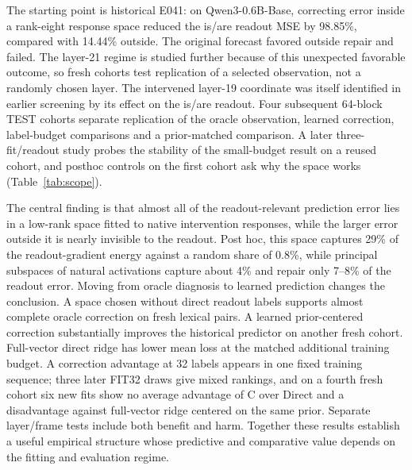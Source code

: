 \documentclass[11pt]{article}
\begin{document}
The starting point is historical E041: on Qwen3-0.6B-Base, correcting error inside a rank-eight response space reduced the is/are readout MSE by 98.85\%, compared with 14.44\% outside. The original forecast favored outside repair and failed. The layer-21 regime is studied further because of this unexpected favorable outcome, so fresh cohorts test replication of a selected observation, not a randomly chosen layer. The intervened layer-19 coordinate was itself identified in earlier screening by its effect on the is/are readout. Four subsequent 64-block TEST cohorts separate replication of the oracle observation, learned correction, label-budget comparisons and a prior-matched comparison. A later three-fit/readout study probes the stability of the small-budget result on a reused cohort, and posthoc controls on the first cohort ask why the space works (Table~\ref{tab:scope}).

The central finding is that almost all of the readout-relevant prediction error lies in a low-rank space fitted to native intervention responses, while the larger error outside it is nearly invisible to the readout. Post hoc, this space captures 29\% of the readout-gradient energy against a random share of 0.8\%, while principal subspaces of natural activations capture about 4\% and repair only 7--8\% of the readout error. Moving from oracle diagnosis to learned prediction changes the conclusion. A space chosen without direct readout labels supports almost complete oracle correction on fresh lexical pairs. A learned prior-centered correction substantially improves the historical predictor on another fresh cohort. Full-vector direct ridge has lower mean loss at the matched additional training budget. A correction advantage at 32 labels appears in one fixed training sequence; three later FIT32 draws give mixed rankings, and on a fourth fresh cohort six new fits show no average advantage of C over Direct and a disadvantage against full-vector ridge centered on the same prior. Separate layer/frame tests include both benefit and harm. Together these results establish a useful empirical structure whose predictive and comparative value depends on the fitting and evaluation regime.
\end{document}

